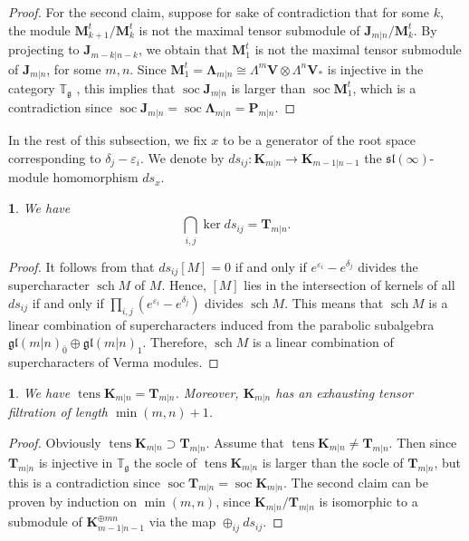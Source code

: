 \documentclass[12pt,oneside,english]{amsart}
\numberwithin{equation}{section}
\numberwithin{figure}{section}
\theoremstyle{plain}
\theoremstyle{plain}
\theoremstyle{remark}
\theoremstyle{definition}
\theoremstyle{plain}
\theoremstyle{remark}
\theoremstyle{definition}
\theoremstyle{plain}
\theoremstyle{plain}
\newtheorem{prop}[thm]{\protect\propositionname}
\theoremstyle{definition}
\providecommand{\propositionname}{Proposition}
\newcommand{\bT}{\mathbf{T}}
\newcommand{\bP}{\mathbf{P}}
\newcommand{\bV}{\mathbf{V}}
\newcommand{\bK}{\mathbf{K}}
\newcommand{\bJ}{\mathbf{J}}
\newcommand{\bM}{\mathbf{M}}
\newcommand{\bW}{\mathbf{\Lambda}}
\newcommand{\soc}{\operatorname{soc}}
\newcommand{\tens}{\operatorname{tens}}
\begin{document}
\begin{proof}
For the second claim, suppose for sake of contradiction that for some $k$, the module $\bM_{k+1}^{t}/\bM_{k}^{t}$
is not the maximal tensor submodule of $\bJ_{m|n}/\bM_{k}^{t}$.
By projecting to $\bJ_{m-k|n-k}$, we obtain that
$\bM_{1}^{t}$ is not the maximal tensor submodule of $\bJ_{m|n}$, for some $m,n$.
Since $\bM_{1}^{t}=\bW_{m|n}\cong\Lambda^{m}\bV\otimes\Lambda^{n}\bV_{*}$
is injective in the category $\mathbb{T}_{\mathfrak{g}}$ \cite{DPS}, this implies that $\soc\bJ_{m|n}$ is larger than $\soc \bM_{1}^{t}$, which is a contradiction since  $\soc\bJ_{m|n}=\soc\bW_{m|n}=\bP_{m|n}$.
\end{proof}




In the rest of this subsection, we fix $x$ to be a generator of the root space corresponding to $\delta_j-\varepsilon_i$. We denote by $ds_{ij}:\bK_{m|n}\to \bK_{m-1|n-1}$
the $\mathfrak{sl}(\infty)$-module homomorphism $ds_x$.
\begin{prop} We have
$$\bigcap_{i,j}\ker ds_{ij}=\bT_{m|n}.$$
\end{prop}
\begin{proof}
It follows from \cite{HR} that $ds_{ij}[M]=0$ if and only if $e^{\varepsilon_i}-e^{\delta_j}$ divides the supercharacter $\operatorname{sch} M$ of $M$.
Hence, $[M]$ lies in the intersection of kernels of all $ds_{ij}$ if and only if $\prod_{i,j} (e^{\varepsilon_i}-e^{\delta_j})$  divides $\operatorname{sch} M$. This means that
$\operatorname{sch} M$ is a linear combination of supercharacters induced from the parabolic subalgebra $\mathfrak{gl}(m|n)_{\bar 0}\oplus \mathfrak{gl}(m|n)_{1}$. Therefore,
$\operatorname{sch} M$ is a linear combination of supercharacters of Verma modules.
\end{proof}






\begin{prop} We have $\tens\bK_{m|n}=\bT_{m|n}$. Moreover, $\bK_{m|n}$ has an exhausting tensor filtration of length $\min(m,n)+1$.
\end{prop}

\begin{proof}  Obviously $\tens\bK_{m|n}\supset \bT_{m|n}$. Assume that  $\tens\bK_{m|n}\neq \bT_{m|n}$. Then since $\bT_{m|n}$ is injective in $\mathbb{T}_{\mathfrak g}$ the socle
of  $\tens\bK_{m|n}$ is larger than the socle of $\bT_{m|n}$, but this is a contradiction since $\soc \bT_{m|n}=\soc \bK_{m|n}$.
The second claim can be proven by induction on $\min(m,n)$, since $\bK_{m|n}/\bT_{m|n}$ is isomorphic to a submodule of $\bK^{\oplus mn}_{m-1|n-1}$ via the map $\oplus_{ij} ds_{ij}$.
\end{proof}
\end{document}
